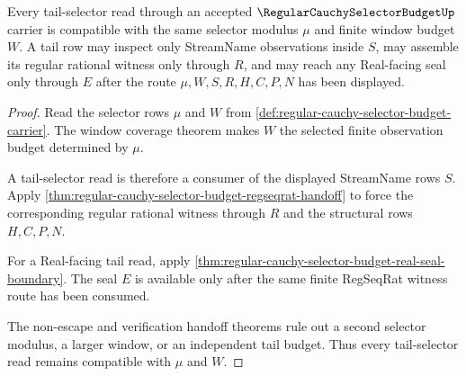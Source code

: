 \begin{theorem}
\label{thm:regular-cauchy-selector-budget-tail-selector-compatibility}
Every tail-selector read through an accepted $\RegularCauchySelectorBudgetUp$ carrier is compatible with the same selector modulus $\mu$ and finite window budget $W$. A tail row may inspect only StreamName observations inside $S$, may assemble its regular rational witness only through $R$, and may reach any Real-facing seal only through $E$ after the route $\mu,W,S,R,H,C,P,N$ has been displayed.
\end{theorem}
\begin{proof}
Read the selector rows $\mu$ and $W$ from \autoref{def:regular-cauchy-selector-budget-carrier}. The window coverage theorem makes $W$ the selected finite observation budget determined by $\mu$.

A tail-selector read is therefore a consumer of the displayed StreamName rows $S$. Apply \autoref{thm:regular-cauchy-selector-budget-regseqrat-handoff} to force the corresponding regular rational witness through $R$ and the structural rows $H,C,P,N$.

For a Real-facing tail read, apply \autoref{thm:regular-cauchy-selector-budget-real-seal-boundary}. The seal $E$ is available only after the same finite RegSeqRat witness route has been consumed.

The non-escape and verification handoff theorems rule out a second selector modulus, a larger window, or an independent tail budget. Thus every tail-selector read remains compatible with $\mu$ and $W$.
\end{proof}

